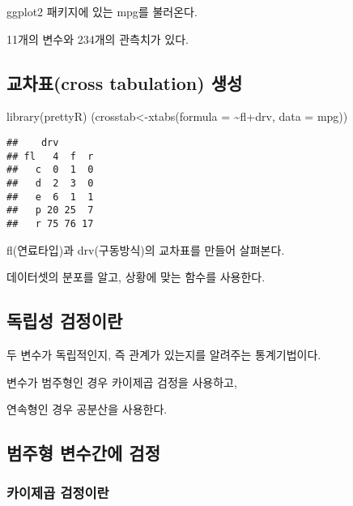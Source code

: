 \documentclass[
]{article}
\newenvironment{Shaded}{\begin{snugshade}}{\end{snugshade}}
\newcommand{\AttributeTok}[1]{\textcolor[rgb]{0.77,0.63,0.00}{#1}}
\newcommand{\FunctionTok}[1]{\textcolor[rgb]{0.00,0.00,0.00}{#1}}
\newcommand{\NormalTok}[1]{#1}
\newcommand{\OtherTok}[1]{\textcolor[rgb]{0.56,0.35,0.01}{#1}}
\newcommand{\SpecialCharTok}[1]{\textcolor[rgb]{0.00,0.00,0.00}{#1}}
\begin{document}
ggplot2 패키지에 있는 mpg를 불러온다.

11개의 변수와 234개의 관측치가 있다.

\hypertarget{uxad50uxcc28uxd45ccross-tabulation-uxc0dduxc131}{%
\subsection{교차표(cross tabulation) 생성}\label{uxad50uxcc28uxd45ccross-tabulation-uxc0dduxc131}}

\begin{Shaded}
\begin{Highlighting}[]
\FunctionTok{library}\NormalTok{(prettyR)}
\NormalTok{(crosstab}\OtherTok{\textless{}{-}}\FunctionTok{xtabs}\NormalTok{(}\AttributeTok{formula =} \SpecialCharTok{\textasciitilde{}}\NormalTok{fl}\SpecialCharTok{+}\NormalTok{drv, }\AttributeTok{data =}\NormalTok{ mpg))}
\end{Highlighting}
\end{Shaded}

\begin{verbatim}
##    drv
## fl   4  f  r
##   c  0  1  0
##   d  2  3  0
##   e  6  1  1
##   p 20 25  7
##   r 75 76 17
\end{verbatim}

fl(연료타입)과 drv(구동방식)의 교차표를 만들어 살펴본다.

데이터셋의 분포를 알고, 상황에 맞는 함수를 사용한다.

\hypertarget{uxb3c5uxb9bduxc131-uxac80uxc815uxc774uxb780}{%
\subsection{독립성 검정이란}\label{uxb3c5uxb9bduxc131-uxac80uxc815uxc774uxb780}}

두 변수가 독립적인지, 즉 관계가 있는지를 알려주는 통계기법이다.

변수가 범주형인 경우 카이제곱 검정을 사용하고,

연속형인 경우 공분산을 사용한다.

\hypertarget{uxbc94uxc8fcuxd615-uxbcc0uxc218uxac04uxc5d0-uxac80uxc815}{%
\subsection{범주형 변수간에 검정}\label{uxbc94uxc8fcuxd615-uxbcc0uxc218uxac04uxc5d0-uxac80uxc815}}

\hypertarget{uxce74uxc774uxc81cuxacf1-uxac80uxc815uxc774uxb780}{%
\subsubsection{카이제곱 검정이란}\label{uxce74uxc774uxc81cuxacf1-uxac80uxc815uxc774uxb780}}
\end{document}
